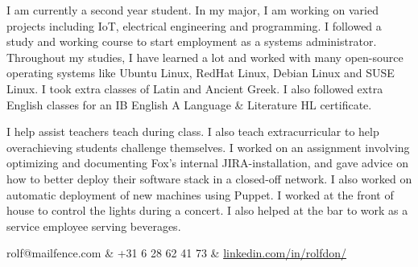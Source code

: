 





\secfont


{
    {
    I am currently a second year student. In my major, I am working on varied projects including IoT, electrical engineering and programming.
    }
    {
    I followed a study and working course to start employment as a systems administrator. Throughout my studies, I have learned a lot and worked with many open-source operating systems like Ubuntu Linux, RedHat Linux, Debian Linux and SUSE Linux.
    }
    {
    I took extra classes of Latin and Ancient Greek. I also followed extra English classes for an IB English A Language \& Literature HL certificate.
    }
}

{
    {
    I help assist teachers teach during class. I also teach extracurricular to help overachieving students challenge themselves.
    }
    {
    I worked on an assignment involving optimizing and documenting Fox's internal JIRA-installation, and gave advice on how to better deploy their software stack in a closed-off network. I also worked on automatic deployment of new machines using Puppet.
    }
    {
    I worked at the front of house to control the lights during a concert. I also helped at the bar to work as a service employee serving beverages.
    }
}

{
}

\vspace{1cm}

{
    rolf@mailfence.com & +31 6 28 62 41 73 & \href{https://www.linkedin.com/in/rolfdon/}{linkedin.com/in/rolfdon/} 
}


